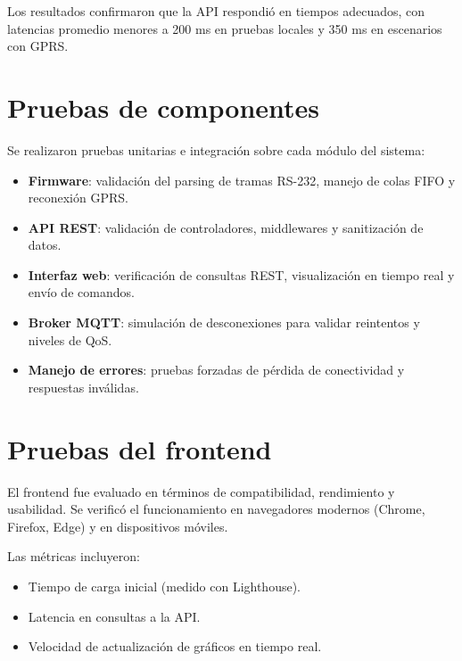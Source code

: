 Los resultados confirmaron que la API respondió en tiempos adecuados, con latencias promedio menores a 200 ms en pruebas locales y 350 ms en escenarios con GPRS.  

\section{Pruebas de componentes}
\label{sec:pruebas-componentes}

Se realizaron pruebas unitarias e integración sobre cada módulo del sistema:  

\begin{itemize}
    \item \textbf{Firmware}: validación del parsing de tramas RS-232, manejo de colas FIFO y reconexión GPRS.
    \item \textbf{API REST}: validación de controladores, middlewares y sanitización de datos.
    \item \textbf{Interfaz web}: verificación de consultas REST, visualización en tiempo real y envío de comandos.
    \item \textbf{Broker MQTT}: simulación de desconexiones para validar reintentos y niveles de QoS.
    \item \textbf{Manejo de errores}: pruebas forzadas de pérdida de conectividad y respuestas inválidas.
\end{itemize}


\section{Pruebas del frontend}
\label{sec:pruebas-frontend}

El frontend fue evaluado en términos de compatibilidad, rendimiento y usabilidad. 
Se verificó el funcionamiento en navegadores modernos (Chrome, Firefox, Edge) 
y en dispositivos móviles.  

Las métricas incluyeron:  
\begin{itemize}
    \item Tiempo de carga inicial (medido con Lighthouse).
    \item Latencia en consultas a la API.
    \item Velocidad de actualización de gráficos en tiempo real.
\end{itemize}

